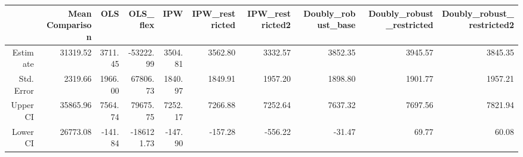 \begin{table}[ht]
\centering
\begin{tabular}{rrrrrrrrrr}
  \hline
 & Mean Comparison & OLS & OLS\_flex & IPW & IPW\_restricted & IPW\_restricted2 & Doubly\_robust\_base & Doubly\_robust\_restricted & Doubly\_robust\_restricted2 \\ 
  \hline
Estimate & 31319.52 & 3711.45 & -53222.99 & 3504.81 & 3562.80 & 3332.57 & 3852.35 & 3945.57 & 3845.35 \\ 
  Std. Error & 2319.66 & 1966.00 & 67806.73 & 1840.97 & 1849.91 & 1957.20 & 1898.80 & 1901.77 & 1957.21 \\ 
  Upper CI & 35865.96 & 7564.74 & 79675.75 & 7252.17 & 7266.88 & 7252.64 & 7637.32 & 7697.56 & 7821.94 \\ 
  Lower CI & 26773.08 & -141.84 & -186121.73 & -147.90 & -157.28 & -556.22 & -31.47 & 69.77 & 60.08 \\ 
   \hline
\end{tabular}
\end{table}
